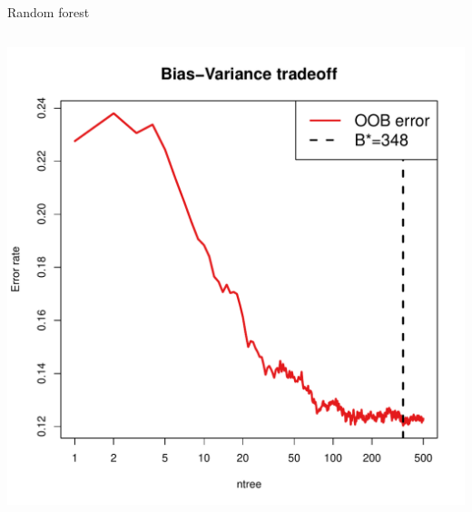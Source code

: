 \begin{frame}[fragile]{Random forest}
\begin{columns}[T]
\begin{column}{0.4\textwidth}
\hspace*{-0.8em}\includegraphics[width=1.4\columnwidth]{../r-StatsLearn-Exam/src/plots/biasvar-rf-apple}

\end{column}
\end{columns}

\end{frame}



